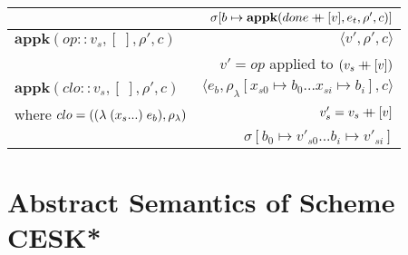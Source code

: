 \documentclass[12pt,draft]{article}
\begin{document}
\begin{center}
\begin{tabular}{@{}l | r@{}}
& $ \sigma[b \mapsto \textbf{appk}(done \mathbin{+\mkern-9mu+} [v] , e_t , \rho' , c)] $ \\
\hline
$ \textbf{appk}(op :: v_s , [\;] , \rho' , c) $
& $\langle v' , \rho' , c \rangle$ \\
& $ v' = op $ applied to $(v_s \mathbin{+\mkern-9mu+} [v])$ \\
\hline
$ \textbf{appk}(clo :: v_s, [\;] , \rho' , c) $
& $\langle e_b , \rho_{\lambda}[x_{s0} \mapsto b_0 ... x_{si} \mapsto b_i] , c \rangle$ \\
where $ clo = ((\lambda\;(x_s ...)\;e_b) , \rho_{\lambda}) $ & $ v'_s = v_s \mathbin{+\mkern-9mu+} [v] $ \\
& $ \sigma[b_0 \mapsto v'_{s0} ... b_i \mapsto v'_{si}] $  \\
\hline
\end{tabular}
\end{center}

\newpage

\section{Abstract Semantics of Scheme CESK*}
\end{document}
